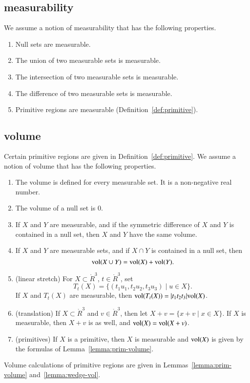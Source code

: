 \subsection{measurability}\label{sec:measure}

We assume a notion of measurability that has the following properties.

\begin{enumerate}%
 \item Null sets are measurable.\\
 \item The union of two measurable sets is measurable.\\
 \item The intersection of two measurable sets is measurable.\\
 \item The difference of two measurable sets is measurable.\\
 \item Primitive regions are measurable (Definition~\ref{def:primitive}).
\end{enumerate}

\subsection{volume}\label{sec:volume}

Certain primitive regions are given in Definition~\ref{def:primitive}.
We assume a notion of volume that has the following properties.

\begin{enumerate}%
 \item The volume is defined for every measurable set.  It is
    a non-negative real number.
 \item The volume of a null set is $0$.
 \item If $X$ and $Y$ are  measurable, and if
 the symmetric difference of
 $X$ and $Y$ is contained in a null set, then 
    $X$ and $Y$ have the same volume.
 \item If $X$ and $Y$ are measurable sets, and if $X\cap
 Y$ is contained in a null set, then
    $$
    {\operatorname{vol}}(X\cup Y) = {\operatorname{vol}}(X) + {\operatorname{vol}}(Y).
    $$
  \item (linear stretch) For $X\subset \ring{R}^3$, $t\in\ring{R}^3$, 
    set 
      $$
      T_t(X) = \{ (t_1u_1,t_2u_2,t_3u_3) \mid u\in X\}.
      $$
    If $X$ and $T_t(X)$ are measurable, then
     ${\operatorname{vol}}(T_t(X)) = |t_1t_2t_3|{\operatorname{vol}}(X)$.
  \item (translation) If $X\subset \ring{R}^3$ and $v\in\ring{R}^3$, then let
    $X+v = \{x + v\mid x\in X\}$.  If $X$ is measurable, then $X+v$ is
    as well, and ${\operatorname{vol}}(X) = {\operatorname{vol}}(X+v)$.
  \item (primitives) If $X$ is a primitive, then $X$ is measurable
    and ${\operatorname{vol}}(X)$ is given by the formulas of Lemma~\ref{lemma:prim-volume}.
\end{enumerate}
Volume calculations of primitive regions are given in 
Lemmas~\ref{lemma:prim-volume} and~\ref{lemma:wedge-vol}.

